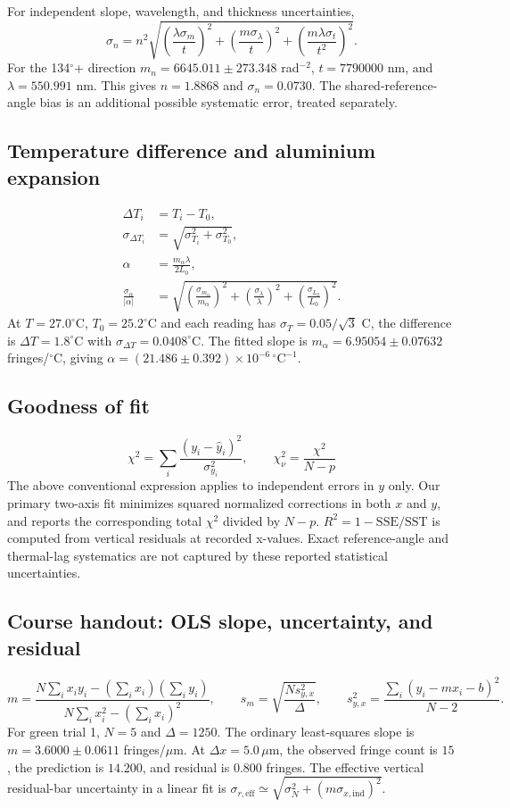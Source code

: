 For independent slope, wavelength, and thickness uncertainties,
\[
\sigma_n=n^2\sqrt{\left(\frac{\lambda\sigma_m}{t}\right)^2+
\left(\frac{m\sigma_\lambda}{t}\right)^2+
\left(\frac{m\lambda\sigma_t}{t^2}\right)^2}.
\]
For the 134$^\circ$+ direction $m_n=6645.011\pm273.348$ rad$^{-2}$,
$t=7790000$ nm, and $\lambda=550.991$ nm. This gives $n=1.8868$ and
$\sigma_n=0.0730$. The shared-reference-angle
bias is an additional possible systematic error, treated separately.

\subsection*{Temperature difference and aluminium expansion}
\begin{align*}
\Delta T_i &= T_i-T_0,\\
\sigma_{\Delta T_i}&=\sqrt{\sigma_{T_i}^2+\sigma_{T_0}^2},\\
\alpha &= \frac{m_\alpha\lambda}{2L_0},\\
\frac{\sigma_\alpha}{|\alpha|} &=
\sqrt{\left(\frac{\sigma_{m_\alpha}}{m_\alpha}\right)^2+
\left(\frac{\sigma_\lambda}{\lambda}\right)^2+
\left(\frac{\sigma_{L_0}}{L_0}\right)^2}.
\end{align*}
At $T=27.0^\circ$C, $T_0=25.2^\circ$C and each reading has
$\sigma_T=0.05/\sqrt3$ C, the difference is $\Delta T=1.8^\circ$C with
$\sigma_{\Delta T}=0.0408^\circ$C.
The fitted slope is $m_\alpha=6.95054\pm0.07632$ fringes/$^\circ$C,
giving $\alpha=(21.486\pm0.392)\times10^{-6}\,^\circ\mathrm{C}^{-1}$.

\subsection*{Goodness of fit}
\[
\chi^2=\sum_i\frac{(y_i-\widehat y_i)^2}{\sigma_{y_i}^2},
\qquad \chi^2_\nu=\frac{\chi^2}{N-p}
\]
The above conventional expression applies to independent errors in $y$ only.
Our primary two-axis fit minimizes squared normalized corrections in both
$x$ and $y$, and reports the corresponding total $\chi^2$ divided by $N-p$.
$R^2=1-\mathrm{SSE}/\mathrm{SST}$ is computed from vertical residuals at
recorded x-values. Exact reference-angle and thermal-lag systematics are not
captured by these reported statistical uncertainties.
\subsection*{Course handout: OLS slope, uncertainty, and residual}
\[
m=\frac{N\sum_i x_i y_i-(\sum_i x_i)(\sum_i y_i)}{N\sum_i x_i^2-(\sum_i x_i)^2},\qquad
s_m=\sqrt{\frac{Ns_{y,x}^2}{\Delta}},\qquad
s_{y,x}^2=\frac{\sum_i(y_i-mx_i-b)^2}{N-2}.
\]
For green trial 1, $N=5$ and $\Delta=1250$. The ordinary least-squares slope is $m=3.6000\pm0.0611$ fringes/$\mu$m.
At $\Delta x=5.0\,\mu$m, the observed fringe count is $15$, the prediction is $14.200$, and residual is $0.800$ fringes.
The effective vertical residual-bar uncertainty in a linear fit is $\sigma_{r,\mathrm{eff}}\simeq\sqrt{\sigma_N^2+(m\sigma_{x,\mathrm{ind}})^2}$.

